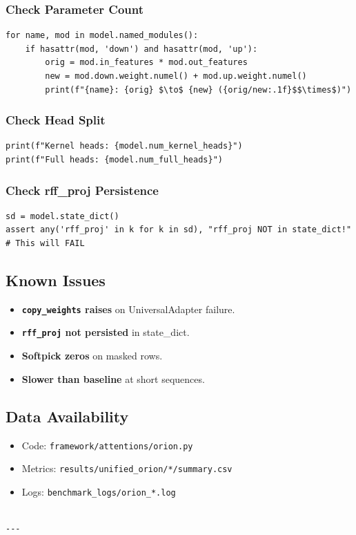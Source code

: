 \subsubsection{Check Parameter Count}

\begin{lstlisting}
for name, mod in model.named_modules():
    if hasattr(mod, 'down') and hasattr(mod, 'up'):
        orig = mod.in_features * mod.out_features
        new = mod.down.weight.numel() + mod.up.weight.numel()
        print(f"{name}: {orig} $\to$ {new} ({orig/new:.1f}$$\times$)")
\end{lstlisting}

\subsubsection{Check Head Split}

\begin{lstlisting}
print(f"Kernel heads: {model.num_kernel_heads}")
print(f"Full heads: {model.num_full_heads}")
\end{lstlisting}

\subsubsection{Check rff\_proj Persistence}

\begin{lstlisting}
sd = model.state_dict()
assert any('rff_proj' in k for k in sd), "rff_proj NOT in state_dict!"  # This will FAIL
\end{lstlisting}

\subsection{Known Issues}

\begin{itemize}
\item \textbf{\texttt{copy\_weights} raises} on UniversalAdapter failure.
\item \textbf{\texttt{rff\_proj} not persisted} in state\_dict.
\item \textbf{Softpick zeros} on masked rows.
\item \textbf{Slower than baseline} at short sequences.

\end{itemize}
\subsection{Data Availability}

\begin{itemize}
\item Code: \texttt{framework/attentions/orion.py}
\item Metrics: \texttt{results/unified\_orion/*/summary.csv}
\item Logs: \texttt{benchmark\_logs/orion\_*.log}
\end{itemize}
\begin{lstlisting}

---
\end{lstlisting}